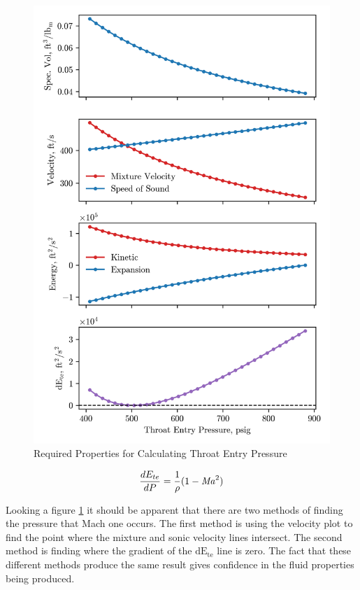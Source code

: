 \documentclass[12 pt]{report}
\newcommand{\Mach}{\mbox{\textit{Ma}}}  %
\newcommand{\dete}{$\mathrm{dE_{te}}$\xspace}  %
\begin{document}
\begin{figure}
    \centering
    \includegraphics[scale=1]{figures/entry_four.png}
    \caption{Required Properties for Calculating Throat Entry Pressure}
    \label{fig:entr_four}
\end{figure}

\begin{equation}
\frac{dE_{te}}{dP} = \frac{1}{\rho}(1 - \Mach^2)
\label{dete_dp}
\end{equation}

Looking a figure \ref{fig:entr_four} it should be apparent that there are two methods of finding the pressure that Mach one occurs. The first method is using the velocity plot to find the point where the mixture and sonic velocity lines intersect. The second method is finding where the gradient of the \dete line is zero. The fact that these different methods produce the same result gives confidence in the fluid properties being produced.
\end{document}
